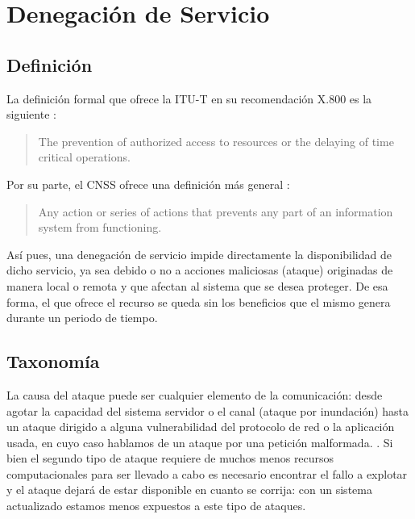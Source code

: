 \section{Denegación de Servicio}\label{sec:Denegacion de Servicio}
\subsection{Definición}\label{ssec:dos definicion}

La definición formal que ofrece la \gls{ITU-T} en su recomendación X.800 es la siguiente \cite{ITU-T_DDoS_def}:

\begin{quote}
 The prevention of authorized access to resources or the delaying of time critical operations.
\end{quote}

Por su parte, el \gls{CNSS} ofrece una definición más general \cite{CCNS_DDoS_def}:

\begin{quote}
 Any action or series of actions that prevents any part of an information system from functioning.
\end{quote}

Así pues, una denegación de servicio impide directamente la disponibilidad de dicho servicio, ya sea debido o no 
a acciones maliciosas (ataque) originadas de manera local o remota y que afectan al sistema que se desea 
proteger. 
De esa forma, el que ofrece el recurso se queda sin los beneficios que el mismo genera durante un periodo de tiempo. %

\subsection{Taxonomía}\label{ssec:dos taxonomia}

La causa del ataque puede ser cualquier elemento de la comunicación: desde agotar
la capacidad del sistema servidor o el canal (ataque por inundación)
hasta un ataque dirigido a alguna vulnerabilidad del protocolo de red o la aplicación usada,
en cuyo caso hablamos de un ataque por una petición malformada.
\cite{Raghavan}. 
Si bien el segundo tipo  de ataque requiere de muchos menos recursos computacionales para
ser llevado a cabo es necesario encontrar el fallo a explotar y el ataque dejará de estar
disponible en cuanto se corrija: con un sistema actualizado estamos menos expuestos
a este tipo de ataques.

